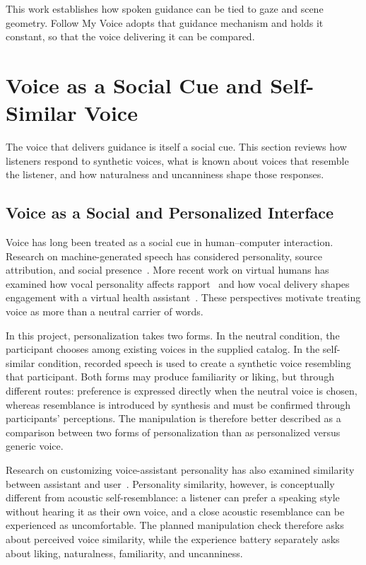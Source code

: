 This work establishes how spoken guidance can be tied to gaze and scene geometry. Follow My Voice adopts that guidance mechanism and holds it constant, so that the voice delivering it can be compared.

\section{Voice as a Social Cue and Self-Similar Voice}
The voice that delivers guidance is itself a social cue. This section reviews how listeners respond to synthetic voices, what is known about voices that resemble the listener, and how naturalness and uncanniness shape those responses.

\subsection{Voice as a Social and Personalized Interface}
Voice has long been treated as a social cue in human--computer interaction. Research on machine-generated speech has considered personality, source attribution, and social presence~\cite{nass1993voices,nass2001personality,lee2005socialpresence}. More recent work on virtual humans has examined how vocal personality affects rapport~\cite{maxim2023vocal} and how vocal delivery shapes engagement with a virtual health assistant~\cite{maxim2025modulation}. These perspectives motivate treating voice as more than a neutral carrier of words.

In this project, personalization takes two forms. In the neutral condition, the participant chooses among existing voices in the supplied catalog. In the self-similar condition, recorded speech is used to create a synthetic voice resembling that participant. Both forms may produce familiarity or liking, but through different routes: preference is expressed directly when the neutral voice is chosen, whereas resemblance is introduced by synthesis and must be confirmed through participants' perceptions. The manipulation is therefore better described as a comparison between two forms of personalization than as personalized versus generic voice.

Research on customizing voice-assistant personality has also examined similarity between assistant and user~\cite{snyder2023onevoice}. Personality similarity, however, is conceptually different from acoustic self-resemblance: a listener can prefer a speaking style without hearing it as their own voice, and a close acoustic resemblance can be experienced as uncomfortable. The planned manipulation check therefore asks about perceived voice similarity, while the experience battery separately asks about liking, naturalness, familiarity, and uncanniness.

